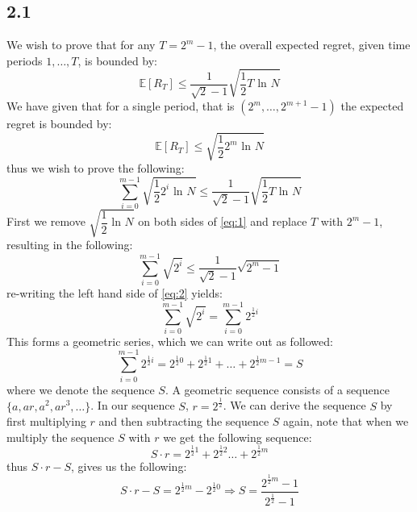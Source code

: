 \documentclass{article}
\begin{document}
\subsection{2.1}
We wish to prove that for any $T=2^m-1$, the overall expected regret, given time periods $1,\dots ,T$, is bounded by:
\begin{equation}
\mathbb{E}[R_T] \leq \dfrac{1}{\sqrt{2}-1}\sqrt{\dfrac{1}{2} T \text{ ln } N}
\end{equation}
We have given that for a single period, that is $(2^m ,\dots,2^{m+1}-1)$ the expected regret is bounded by:
\begin{equation}
\mathbb{E}[R_T] \leq \sqrt{\frac{1}{2} 2^m \text{ ln } N}
\end{equation}
thus we wish to prove the following:
\begin{equation}
\label{eq:1}
\sum\limits_{i=0}^{m-1}  \sqrt{\frac{1}{2} 2^i \text{ ln } N} \leq \dfrac{1}{\sqrt{2}-1}\sqrt{\dfrac{1}{2} T \text{ ln } N}
\end{equation}
First we remove $\sqrt{\dfrac{1}{2} \text{ ln }N}$ on both sides of \eqref{eq:1} and replace $T$ with $2^m-1$, resulting in the following:
\begin{equation}
\label{eq:2}
\sum\limits_{i=0}^{m-1} \sqrt{2^i} \leq \dfrac{1}{\sqrt{2}-1}\sqrt{2^m - 1}
\end{equation}
re-writing the left hand side of \eqref{eq:2} yields:
\begin{equation}
\label{eq:newineq}
\sum\limits_{i=0}^{m-1} \sqrt{2^i}=\sum\limits_{i=0}^{m-1} 2^{\frac{1}{2} i}
\end{equation}
This forms a geometric series, which we can write out as followed:
\begin{equation}
\sum\limits_{i=0}^{m-1} 2^{\frac{1}{2} i} = 2^{\frac{1}{2} 0} + 2^{\frac{1}{2} 1} + \dots + 2^{\frac{1}{2} m-1} = S
\end{equation}
where we denote the sequence $S$. A geometric sequence consists of a sequence $\lbrace a, ar, a^2, ar^3, \dots \rbrace$. In our sequence $S$, $r=2^{\frac{1}{2}}$. We can derive the sequence $S$ by first multiplying $r$ and then subtracting the sequence $S$ again, note that when we multiply the sequence $S$ with $r$ we get the following sequence:
\begin{equation}
S\cdot r = 2^{\frac{1}{2} 1} + 2^{\frac{1}{2} 2}  \dots + 2^{\frac{1}{2} m}
\end{equation}
thus $S \cdot r- S$, gives us the following:
\begin{equation}
S \cdot r - S = 2^{\frac{1}{2}m} - 2^{\frac{1}{2}0} \Rightarrow
S = \dfrac{2^{\frac{1}{2}m}-1}{2^{\frac{1}{2}}-1}
\end{equation}
\end{document}
